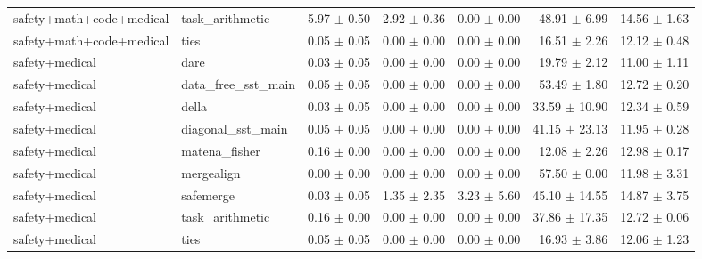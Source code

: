 \documentclass{article}
\begin{document}
\begin{table}[H]
{\begin{tabular}{llrrrrr}
safety+math+code+medical & task\_arithmetic & 5.97 $\pm$ 0.50 & 2.92 $\pm$ 0.36 & 0.00 $\pm$ 0.00 & 48.91 $\pm$ 6.99 & 14.56 $\pm$ 1.63 \\
safety+math+code+medical & ties & 0.05 $\pm$ 0.05 & 0.00 $\pm$ 0.00 & 0.00 $\pm$ 0.00 & 16.51 $\pm$ 2.26 & 12.12 $\pm$ 0.48 \\
safety+medical & dare & 0.03 $\pm$ 0.05 & 0.00 $\pm$ 0.00 & 0.00 $\pm$ 0.00 & 19.79 $\pm$ 2.12 & 11.00 $\pm$ 1.11 \\
safety+medical & data\_free\_sst\_main & 0.05 $\pm$ 0.05 & 0.00 $\pm$ 0.00 & 0.00 $\pm$ 0.00 & 53.49 $\pm$ 1.80 & 12.72 $\pm$ 0.20 \\
safety+medical & della & 0.03 $\pm$ 0.05 & 0.00 $\pm$ 0.00 & 0.00 $\pm$ 0.00 & 33.59 $\pm$ 10.90 & 12.34 $\pm$ 0.59 \\
safety+medical & diagonal\_sst\_main & 0.05 $\pm$ 0.05 & 0.00 $\pm$ 0.00 & 0.00 $\pm$ 0.00 & 41.15 $\pm$ 23.13 & 11.95 $\pm$ 0.28 \\
safety+medical & matena\_fisher & 0.16 $\pm$ 0.00 & 0.00 $\pm$ 0.00 & 0.00 $\pm$ 0.00 & 12.08 $\pm$ 2.26 & 12.98 $\pm$ 0.17 \\
safety+medical & mergealign & 0.00 $\pm$ 0.00 & 0.00 $\pm$ 0.00 & 0.00 $\pm$ 0.00 & 57.50 $\pm$ 0.00 & 11.98 $\pm$ 3.31 \\
safety+medical & safemerge & 0.03 $\pm$ 0.05 & 1.35 $\pm$ 2.35 & 3.23 $\pm$ 5.60 & 45.10 $\pm$ 14.55 & 14.87 $\pm$ 3.75 \\
safety+medical & task\_arithmetic & 0.16 $\pm$ 0.00 & 0.00 $\pm$ 0.00 & 0.00 $\pm$ 0.00 & 37.86 $\pm$ 17.35 & 12.72 $\pm$ 0.06 \\
safety+medical & ties & 0.05 $\pm$ 0.05 & 0.00 $\pm$ 0.00 & 0.00 $\pm$ 0.00 & 16.93 $\pm$ 3.86 & 12.06 $\pm$ 1.23 \\
\bottomrule
\end{tabular}
}
\end{table}



\end{document}
